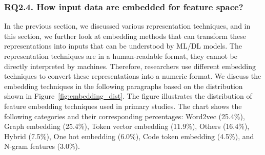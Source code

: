 





\subsubsection{RQ2.4. How input data are embedded for feature space?}
In the previous section, we discussed various representation techniques, and in this section, we further look at embedding methods that can transform these representations into inputs that can be understood by ML/DL models. 
The representation techniques are in a human-readable format, they cannot be directly interpreted by machines. Therefore, researchers use different embedding techniques to convert these representations into a numeric format. We discuss the embedding techniques in the following paragraphs based on the distribution shown in Figure~\ref{fig:embedding_dist}. The figure illustrates the distribution of feature embedding techniques used in primary studies. The chart shows the following categories and their corresponding percentages: Word2vec (25.4\%), Graph embedding (25.4\%), Token vector embedding (11.9\%), Others (16.4\%), Hybrid (7.5\%), One hot embedding (6.0\%), Code token embedding (4.5\%), and N-gram features (3.0\%).


